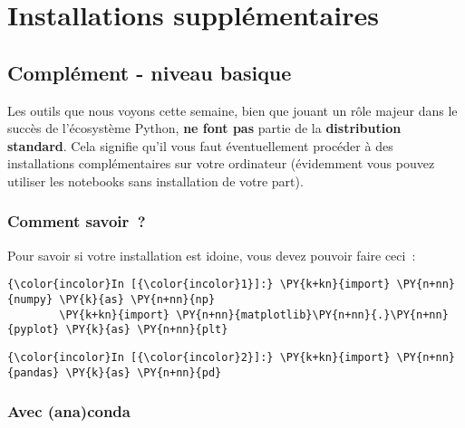     
    
    
    

    

    \hypertarget{installations-suppluxe9mentaires}{%
\section{Installations
supplémentaires}\label{installations-suppluxe9mentaires}}

    \hypertarget{compluxe9ment---niveau-basique}{%
\subsection{Complément - niveau
basique}\label{compluxe9ment---niveau-basique}}

    Les outils que nous voyons cette semaine, bien que jouant un rôle majeur
dans le succès de l'écosystème Python, \textbf{ne font pas} partie de la
\textbf{distribution standard}. Cela signifie qu'il vous faut
éventuellement procéder à des installations complémentaires sur votre
ordinateur (évidemment vous pouvez utiliser les notebooks sans
installation de votre part).

    \hypertarget{comment-savoir}{%
\subsubsection{Comment savoir~?}\label{comment-savoir}}

    Pour savoir si votre installation est idoine, vous devez pouvoir faire
ceci~:

    \begin{Verbatim}[commandchars=\\\{\},frame=single,framerule=0.3mm,rulecolor=\color{cellframecolor}]
{\color{incolor}In [{\color{incolor}1}]:} \PY{k+kn}{import} \PY{n+nn}{numpy} \PY{k}{as} \PY{n+nn}{np}
        \PY{k+kn}{import} \PY{n+nn}{matplotlib}\PY{n+nn}{.}\PY{n+nn}{pyplot} \PY{k}{as} \PY{n+nn}{plt}
\end{Verbatim}


    \begin{Verbatim}[commandchars=\\\{\},frame=single,framerule=0.3mm,rulecolor=\color{cellframecolor}]
{\color{incolor}In [{\color{incolor}2}]:} \PY{k+kn}{import} \PY{n+nn}{pandas} \PY{k}{as} \PY{n+nn}{pd}
\end{Verbatim}


    \hypertarget{avec-anaconda}{%
\subsubsection{Avec (ana)conda}\label{avec-anaconda}}

